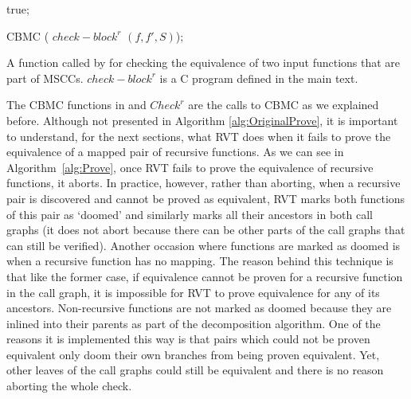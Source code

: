 \begin{algorithm}
\begin{algorithmic}[1]


 true; \EndIf

 CBMC ( $check-block^r$  $(f,f',S)$); \EndFunction
\end{algorithmic}
\caption{A function called by  for checking the equivalence of two input functions that are part of MSCCs. $check-block^r$ is a C program defined in the main text.}
\label{alg:Checkr}
\end{algorithm}


The CBMC functions in  and $Check^r$ are the calls to CBMC as we explained before.
Although not presented in Algorithm \ref{alg:OriginalProve}, it is important to understand, for the next sections, what RVT does when it fails to prove the equivalence of a mapped pair of recursive functions. As we can see in Algorithm~\ref{alg:Prove}, once RVT fails to prove the equivalence of recursive functions, it aborts. In practice, however, rather than aborting, when a recursive pair is discovered and cannot be proved as equivalent, RVT marks both functions of this pair as `doomed' and similarly marks all their ancestors in both call graphs (it does not abort because there can be other parts of the call graphs that can still be verified). Another occasion where functions are marked as doomed is when a recursive function has no mapping. The reason behind this technique is that like the former case, if equivalence cannot be proven for a recursive function in the call graph, it is impossible for RVT to prove equivalence for any of its ancestors. Non-recursive functions are not marked as doomed because they are inlined into their parents as part of the decomposition algorithm. One of the reasons it is implemented this way is that pairs which could not be proven equivalent only doom their own branches from being proven equivalent. Yet, other leaves of the call graphs could still be equivalent and there is no reason aborting the whole check. 
  
